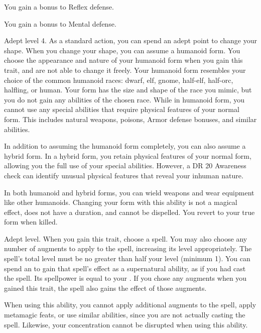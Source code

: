     \featben You gain a  bonus to Reflex defense.

    \featben You gain a  bonus to Mental defense.

    \featpre Adept level 4.
    \featben As a standard action, you can spend an adept point to change your shape.
    When you change your shape, you can assume a humanoid form.
    You choose the appearance and nature of your humanoid form when you gain this trait, and are not able to change it freely.
    Your humanoid form resembles your choice of the common humanoid races: dwarf, elf, gnome, half-elf, half-orc, halfling, or human.
    Your form has the size and shape of the race you mimic, but you do not gain any abilities of the chosen race.
    While in humanoid form, you cannot use any special abilities that require physical features of your normal form.
    This includes natural weapons, poisons, Armor defense bonuses, and similar abilities.

    In addition to assuming the humanoid form completely, you can also assume a hybrid form.
    In a hybrid form, you retain physical features of your normal form, allowing you the full use of your special abilities.
    However, a DR 20 Awareness check can identify unusual physical features that reveal your inhuman nature.

    In both humanoid and hybrid forms, you can wield weapons and wear equipment like other humanoids.
    Changing your form with this ability is not a magical effect, does not have a duration, and cannot be dispelled.
    You revert to your true form when killed.

    \featpre Adept level.
    \featben When you gain this trait, choose a spell.
    You may also choose any number of augments to apply to the spell, increasing its level appropriately.
    The spell's total level must be no greater than half your level (minimum 1).
    You can spend an  to gain that spell's effect as a supernatural ability, as if you had cast the spell.
    Its spellpower is equal to your .
    If you chose any augments when you gained this trait, the spell also gains the effect of those augments.

    When using this ability, you cannot apply additional augments to the spell, apply metamagic feats, or use similar abilities, since you are not actually casting the spell.
    Likewise, your concentration cannot be disrupted when using this ability.

